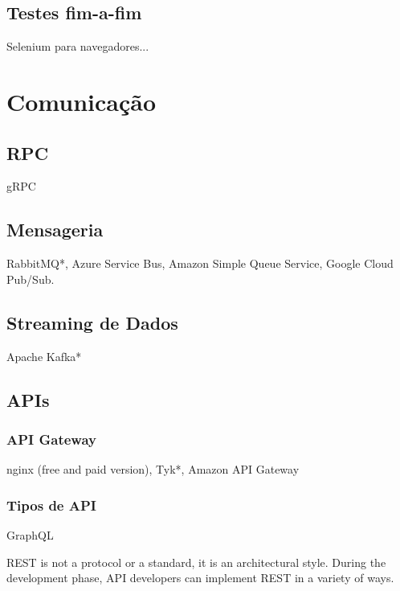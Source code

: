 \subsection{Testes fim-a-fim}
Selenium para navegadores...


\section{Comunicação}

\subsection{RPC}
gRPC 

\subsection{Mensageria}
RabbitMQ*, Azure Service Bus, Amazon Simple Queue Service, Google Cloud Pub/Sub.

\subsection{Streaming de Dados}
Apache Kafka*

\subsection{APIs}

\subsubsection{API Gateway}
nginx (free and paid version), Tyk*, Amazon API Gateway

\subsubsection{Tipos de API}

GraphQL 

REST is not a protocol or a standard, it is an architectural style. During the development phase, API developers can implement REST in a variety of ways.

